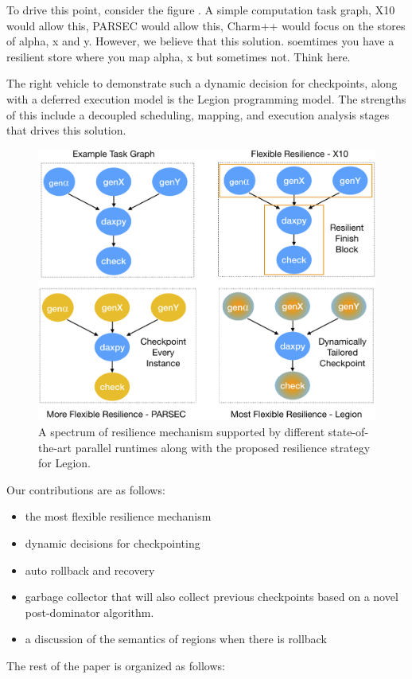 To drive this point, consider the figure . A simple computation task graph, X10
would allow this, PARSEC would allow this, Charm++ would focus on the stores of
alpha, x and y. However, we believe that this solution.  soemtimes you have a
resilient store where you map alpha, x but sometimes not. Think here.

The right vehicle to demonstrate such a dynamic decision for checkpoints, along
with a deferred execution model is the Legion programming model. The strengths
of this include a decoupled scheduling, mapping, and execution analysis stages
that drives this solution.

\begin{figure}
\includegraphics[width=.40\textwidth]{images/spectrum_x10_parsec_legion_policies.png}
\caption{A spectrum of resilience mechanism supported by different
state-of-the-art parallel runtimes along with the proposed resilience strategy
for Legion.} 
\end{figure}

Our contributions are as follows: 
\begin{itemize} 
\item the most flexible resilience mechanism 
\item dynamic decisions for checkpointing 
\item auto rollback and recovery 
\item garbage collector that will also collect previous 
checkpoints based on a novel post-dominator algorithm.  
\item a discussion of the semantics of regions when there is rollback 
\end{itemize}

The rest of the paper is organized as follows:

